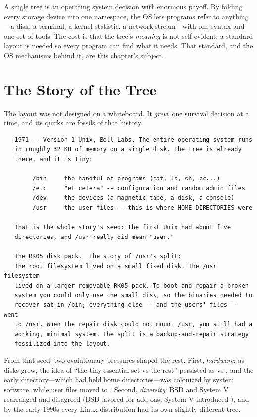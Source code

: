 \begin{osconcept}
A single tree is an operating system decision with enormous payoff. By
folding every storage device into one namespace, the OS lets programs
refer to anything---a disk, a terminal, a kernel statistic, a network
stream---with one syntax and one set of tools. The cost is that the
tree's \emph{meaning} is not self-evident; a standard layout is needed
so every program can find what it needs. That standard, and the OS
mechanisms behind it, are this chapter's subject.
\end{osconcept}

\section{The Story of the Tree}

The layout was not designed on a whiteboard. It \emph{grew}, one
survival decision at a time, and its quirks are fossils of that
history.

\begin{verbatim}
   1971 -- Version 1 Unix, Bell Labs. The entire operating system runs
   in roughly 32 KB of memory on a single disk. The tree is already
   there, and it is tiny:

        /bin     the handful of programs (cat, ls, sh, cc...)
        /etc     "et cetera" -- configuration and random admin files
        /dev     the devices (a magnetic tape, a disk, a console)
        /usr     the user files -- this is where HOME DIRECTORIES were

   That is the whole story's seed: the first Unix had about five
   directories, and /usr really did mean "user."

   The RK05 disk pack.  The story of /usr's split:
   The root filesystem lived on a small fixed disk. The /usr filesystem
   lived on a larger removable RK05 pack. To boot and repair a broken
   system you could only use the small disk, so the binaries needed to
   recover sat in /bin; everything else -- and the users' files -- went
   to /usr. When the repair disk could not mount /usr, you still had a
   working, minimal system. The split is a backup-and-repair strategy
   fossilized into the layout.
\end{verbatim}

From that seed, two evolutionary pressures shaped the rest. First,
\emph{hardware}: as disks grew, the idea of ``the tiny essential set
vs the rest'' persisted as  vs , and the
early  directory---which had held home directories---was
colonized by system software, while user files moved to
. Second, \emph{diversity}: BSD and System V rearranged
and disagreed (BSD favored  for add-ons, System V
introduced ), and by the early 1990s every Linux
distribution had its own slightly different tree.


